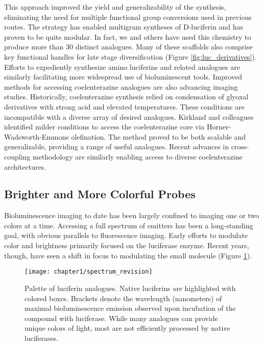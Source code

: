 This approach improved the yield and generalizability of
the synthesis, eliminating the need for multiple functional
group conversions used in previous routes. The strategy has
enabled multigram syntheses of D-luciferin and has proven to
be quite modular. In fact, we and others have used this
chemistry to produce more than 30 distinct analogues.\cite{Woodroofe:2012vx} Many
of these scaffolds also comprise key functional handles for late stage
diversification (Figure \ref{fig:luc_derivatives}). Efforts to expediently
synthesize amino luciferins\cite{Hauser:2016jt} and related analogues\cite{Anderson:2017hb} are similarly
facilitating more widespread use of bioluminescent tools.
Improved methods for accessing coelenterazine analogues
are also advancing imaging studies. Historically, coelenterazine
synthesis relied on condensation of glyoxal derivatives with
strong acid and elevated temperatures. These conditions are
incompatible with a diverse array of desired analogues. Kirkland
and colleagues identified milder conditions to access the
coelenterazine core via Horner-Wadsworth-Emmons olefination.\cite{Shakhmin:2016bd}
The method proved to be both scalable and generalizable,
providing a range of useful analogues. Recent advances
in cross-coupling methodology are similarly enabling access to
diverse coelenterazine architectures.\cite{Hosoya:2015iu}
\subsection*{Brighter and More Colorful Probes}
Bioluminescence imaging to date has been largely confined to imaging one or
two colors at a time. Accessing a full spectrum of emitters has
been a long-standing goal, with obvious parallels to
fluorescence imaging. Early efforts to modulate color and
brightness primarily focused on the luciferase enzyme.\cite{RN26} Recent
years, though, have seen a shift in focus to modulating the small
molecule (Figure \ref{fig:luc_spectrum}).

\begin{figure}[htbp]
\texttt{[image: chapter1/spectrum\_revision]}
\centering
\caption[Palette of luciferin analogues]{Palette of luciferin analogues. Native luciferins are highlighted with colored boxes. Brackets denote the wavelength (nanometers) of
maximal bioluminescence emission observed upon incubation of the compound with luciferase. While many analogues can provide unique colors of
light, most are not efficiently processed by native luciferases.}
  \label{fig:luc_spectrum}
\end{figure}

